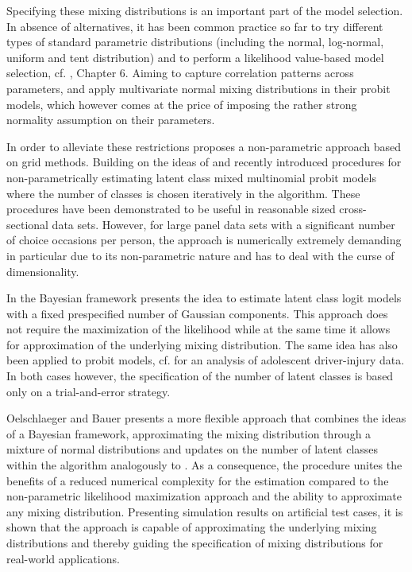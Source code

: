 \documentclass[article]{jss}
\begin{document}
Specifying these mixing distributions is an important part of the model selection. In absence of alternatives, it has been common practice so far to try different types of standard parametric distributions (including the normal, log-normal, uniform and tent distribution) and to perform a likelihood value-based model selection, cf. \cite{Train:2009}, Chapter 6. Aiming to capture correlation patterns across parameters, \cite{Fountas:2018} and \cite{Fountas:2019} apply multivariate normal mixing distributions in their probit models, which however comes at the price of imposing the rather strong normality assumption on their parameters.

In order to alleviate these restrictions \cite{Train:2016} proposes a non-parametric approach based on grid methods. Building on the ideas of \cite{Train:2016} and \cite{Bhat:2018} recently \cite{Bauer:2019} introduced procedures for non-parametrically estimating latent class mixed multinomial probit models where the number of classes is chosen iteratively in the algorithm. These procedures have been demonstrated to be useful in reasonable sized cross-sectional data sets. However, for large panel data sets with a significant number of choice occasions per person, the approach is numerically extremely demanding in particular due to its non-parametric nature and has to deal with the curse of dimensionality.

In the Bayesian framework \cite{Scaccia:2010} presents the idea to estimate latent class logit models with a fixed prespecified number of Gaussian components. This approach does not require the maximization of the likelihood while at the same time it allows for approximation of the underlying mixing distribution. The same idea has also been applied to probit models, cf. \cite{Xiong:2013} for an analysis of adolescent driver-injury data. In both cases however, the specification of the number of latent classes is based only on a trial-and-error strategy.

Oelschlaeger and Bauer presents a more flexible approach that combines the ideas of a Bayesian framework, approximating the mixing distribution through a mixture of normal distributions and updates on the number of latent classes within the algorithm analogously to \cite{Bauer:2019}. As a consequence, the procedure unites the benefits of a reduced numerical complexity for the estimation compared to the non-parametric likelihood maximization approach and the ability to approximate any mixing distribution. Presenting simulation results on artificial test cases, it is shown that the approach is capable of approximating the underlying mixing distributions and thereby guiding the specification of mixing distributions for real-world applications.
\end{document}
